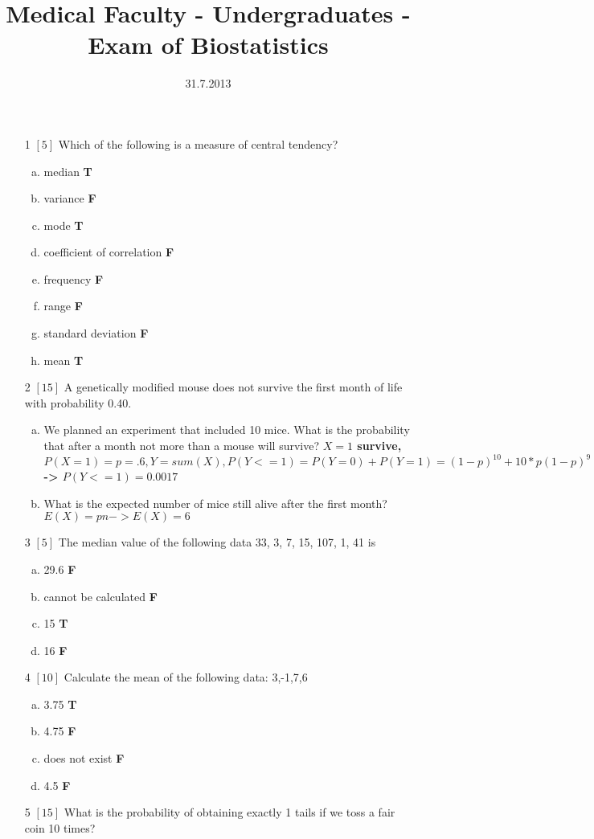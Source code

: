 \documentclass{article}
\title{Medical Faculty - Undergraduates  - Exam of Biostatistics}
\date{31.7.2013}
\begin{document}
\maketitle{}
\begin{itemize}
\item[1] {\small $\left[5\right]$ }Which of the following is a measure of central tendency?
\begin{enumerate}[(a)]
\item median 
{\bf T }\item variance 
{\bf F }\item mode 
{\bf T }\item coefficient of correlation 
{\bf F }\item frequency 
{\bf F }\item range 
{\bf F }\item standard deviation 
{\bf F }\item mean 
{\bf T }\end{enumerate}
\item[2] {\small $\left[15\right]$ }A genetically modified mouse does not survive the first month of life with probability 0.40.  
\begin{enumerate}[(a)]
\item We planned an experiment that included 10 mice. What is the probability that after a month not more than a mouse will survive? 
{\bf $X=1$ survive, $P(X=1)=p=.6, Y=sum(X), P(Y<=1)=P(Y=0)+P(Y=1)=(1-p)^10+10*p(1-p)^9$ -> $P(Y<=1)= 0.0017$ }\vspace{\baselineskip} \vspace{\baselineskip}\item What is the expected number of mice still alive after the first month? 
{\bf $E(X)=pn -> E(X)=6$ }\vspace{\baselineskip}\end{enumerate}
\item[3] {\small $\left[5\right]$ }The median value of the following data 33, 3, 7, 15, 107, 1, 41 is
\begin{enumerate}[(a)]
\item 29.6 
{\bf F }\item cannot be calculated 
{\bf F }\item 15 
{\bf T }\item 16 
{\bf F }\end{enumerate}
\item[4] {\small $\left[10\right]$ }Calculate the mean of the following data:  
3,-1,7,6\begin{enumerate}[(a)]
\item  3.75  
{\bf T }\item 4.75  
{\bf F }\item does not exist 
{\bf F }\item 4.5  
{\bf F }\end{enumerate}
\item[5] {\small $\left[15\right]$ }
What is the probability of obtaining exactly 1 tails if we toss a fair coin 10 times?
{\bf 
 
}
\end{itemize}
\end{document}
